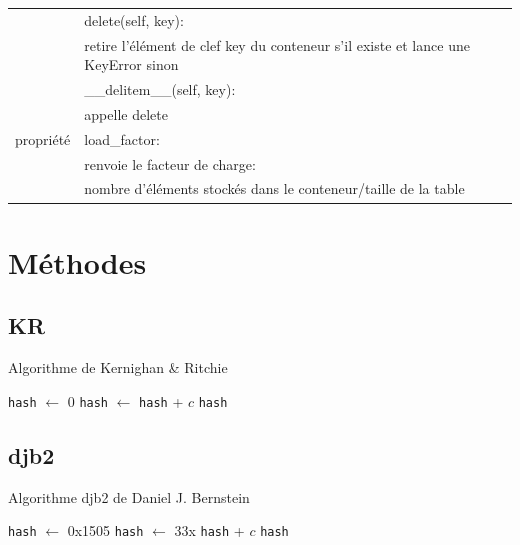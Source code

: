 \documentclass[utf8]{article}
\begin{document}
\begin{tabular}{|c|c|c|c|}
                         & \multicolumn{3}{l|}{delete(self, key):}\\
                         & \multicolumn{3}{l|}{retire l’élément de clef key du conteneur s’il existe et lance une KeyError sinon} \\\cline{2-4}
                         
                         & \multicolumn{3}{l|}{\_\_delitem\_\_(self, key):}\\
                         & \multicolumn{3}{l|}{ appelle delete} \\\cline{2-4}
 \hline
 propriété & \multicolumn{3}{l|}{load\_factor:} \\
            & \multicolumn{3}{l|}{renvoie le facteur de charge:}\\ 
            & \multicolumn{3}{l|}{nombre d’éléments
    stockés dans le conteneur/taille de la table} \\

\hline

\end{tabular}

\section{Méthodes}
\subsection{KR}

\begin{algorithm}
\caption{Algorithme de Kernighan \& Ritchie}
\begin{algorithmic}[1]
\State \verb+hash+ $\gets$ 0
  \State \verb+hash+ $\gets$ \verb+hash+ + $c$
\EndFor
\State \Return \verb+hash+
\EndProcedure
\end{algorithmic}
\end{algorithm}

\subsection{djb2}

\begin{algorithm}
\caption{Algorithme djb2 de Daniel J. Bernstein}
\begin{algorithmic}[1]
\State \verb+hash+ $\gets$ 0x1505
  \State \verb+hash+ $\gets$ 33x \verb+hash+ + $c$
\EndFor
\State \Return \verb+hash+
\EndProcedure
\end{algorithmic}
\end{algorithm}
\end{document}
